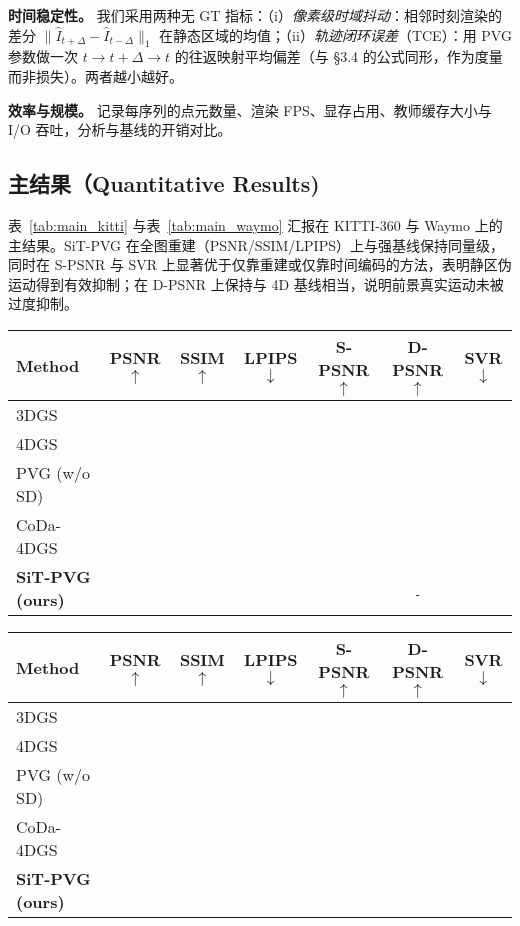 \documentclass[10pt,conference]{IEEEtran} %
\begin{document}
\textbf{时间稳定性。} 我们采用两种无 GT 指标：（i）\emph{像素级时域抖动}：相邻时刻渲染的差分 $\|\hat I_{t+\Delta}-\hat I_{t-\Delta}\|_1$ 在静态区域的均值；（ii）\emph{轨迹闭环误差}（TCE）：用 PVG 参数做一次 $t\!\to\!t{+}\Delta\!\to\!t$ 的往返映射平均偏差（与 §3.4 的公式同形，作为度量而非损失）。两者越小越好。

\textbf{效率与规模。} 记录每序列的点元数量、渲染 FPS、显存占用、教师缓存大小与 I/O 吞吐，分析与基线的开销对比。

\subsection{主结果（Quantitative Results)}
表~\ref{tab:main_kitti} 与表~\ref{tab:main_waymo} 汇报在 KITTI\mbox{-}360 与 Waymo 上的主结果。SiT\mbox{-}PVG 在全图重建（PSNR/SSIM/LPIPS）上与强基线保持同量级，同时在 S\mbox{-}PSNR 与 SVR 上显著优于仅靠重建或仅靠时间编码的方法，表明静区伪运动得到有效抑制；在 D\mbox{-}PSNR 上保持与 4D 基线相当，说明前景真实运动未被过度抑制。

\begin{table*}[t]
\centering
\caption{KITTI\mbox{-}360 上的主结果（插值/外推设置）。粗体为最佳，\underline{下划线}次优。}
\label{tab:main_kitti}
\begin{tabular}{lcccccc}
\toprule
Method & PSNR$\uparrow$ & SSIM$\uparrow$ & LPIPS$\downarrow$ & S\mbox{-}PSNR$\uparrow$ & D\mbox{-}PSNR$\uparrow$ & SVR$\downarrow$ \\
\midrule
3DGS & \, & \, & \, & \, & \, & \, \\
4DGS & \, & \, & \, & \, & \, & \, \\
PVG (w/o SD) & \, & \, & \, & \, & \, & \, \\
CoDa\mbox{-}4DGS & \, & \, & \, & \, & \, & \, \\
\textbf{SiT\mbox{-}PVG (ours)} & \textbf{\,} & \textbf{\,} & \textbf{\,} & \textbf{\,} & \underline{\,} & \textbf{\,} \\
\bottomrule
\end{tabular}
\end{table*}

\begin{table*}[t]
\centering
\caption{Waymo Open 上的主结果（插值/外推设置）。}
\label{tab:main_waymo}
\begin{tabular}{lcccccc}
\toprule
Method & PSNR$\uparrow$ & SSIM$\uparrow$ & LPIPS$\downarrow$ & S\mbox{-}PSNR$\uparrow$ & D\mbox{-}PSNR$\uparrow$ & SVR$\downarrow$ \\
\midrule
3DGS & \, & \, & \, & \, & \, & \, \\
4DGS & \, & \, & \, & \, & \, & \, \\
PVG (w/o SD) & \, & \, & \, & \, & \, & \, \\
CoDa\mbox{-}4DGS & \, & \, & \, & \, & \, & \, \\
\textbf{SiT\mbox{-}PVG (ours)} & \textbf{\,} & \textbf{\,} & \textbf{\,} & \textbf{\,} & \, & \textbf{\,} \\
\bottomrule
\end{tabular}
\end{table*}
\end{document}
